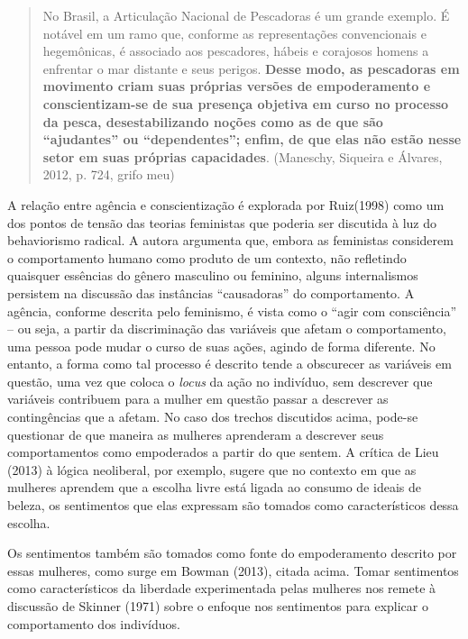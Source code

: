 \begin{quote}
    No Brasil, a Articulação Nacional de Pescadoras é um grande exemplo. É notável em um ramo que, conforme as representações convencionais e hegemônicas, é associado aos pescadores, hábeis e corajosos homens a enfrentar o mar distante e seus perigos. \textbf{Desse modo, as pescadoras em movimento criam suas próprias versões de empoderamento e conscientizam-se de sua presença objetiva em curso no processo da pesca, desestabilizando noções como as de que são ``ajudantes'' ou ``dependentes''; enfim, de que elas não estão nesse setor em suas próprias capacidades}. (Maneschy, Siqueira e Álvares, 2012, p. 724, grifo meu)
\end{quote}

A relação entre agência e conscientização é explorada por Ruiz\linebreak (1998) como um dos pontos de tensão das teorias feministas que poderia ser discutida à luz do behaviorismo radical. A autora argumenta que, embora as feministas considerem o comportamento humano como produto de um contexto, não refletindo quaisquer essências do gênero masculino ou feminino, alguns internalismos persistem na discussão das instâncias ``causadoras'' do comportamento. A agência, conforme descrita pelo feminismo, é vista como o ``agir com consciência'' – ou seja, a partir da discriminação das variáveis que afetam o comportamento, uma pessoa pode mudar o curso de suas ações, agindo de forma diferente. No entanto, a forma como tal processo é descrito tende a obscurecer as variáveis em questão, uma vez que coloca o \textit{locus} da ação no indivíduo, sem descrever que variáveis contribuem para a mulher em questão passar a descrever as contingências que a afetam. No caso dos trechos discutidos acima, pode-se questionar de que maneira as mulheres aprenderam a descrever seus comportamentos como empoderados a partir do que sentem. A crítica de Lieu (2013) à lógica neoliberal, por exemplo, sugere que no contexto em que as mulheres aprendem que a escolha livre está ligada ao consumo de ideais de beleza, os sentimentos que elas expressam são tomados como característicos dessa escolha.

Os sentimentos também são tomados como fonte do empoderamento descrito por essas mulheres, como surge em Bowman (2013), citada acima. Tomar sentimentos como característicos da liberdade experimentada pelas mulheres nos remete à discussão de Skinner (1971) sobre o enfoque nos sentimentos para explicar o comportamento dos indivíduos.

